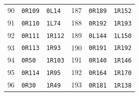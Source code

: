 \begin{longtable}{@{}rll@{\qquad\qquad}rll@{}}
90 & \texttt{0R109} & \texttt{0L14} & 187 & \texttt{0R189} & \texttt{1R152}\\
91 & \texttt{0R110} & \texttt{1L74} & 188 & \texttt{0R192} & \texttt{1R193}\\
92 & \texttt{0R111} & \texttt{1R112} & 189 & \texttt{0L144} & \texttt{1L150}\\
93 & \texttt{0R113} & \texttt{1R93} & 190 & \texttt{0R191} & \texttt{1R192}\\
94 & \texttt{0R50} & \texttt{1R103} & 191 & \texttt{0R140} & \texttt{1R146}\\
95 & \texttt{0R114} & \texttt{1R95} & 192 & \texttt{0R164} & \texttt{1R170}\\
96 & \texttt{0R30} & \texttt{1R49} & 193 & \texttt{0R181} & \texttt{1R138}\\
\bottomrule\end{longtable}\endgroup
